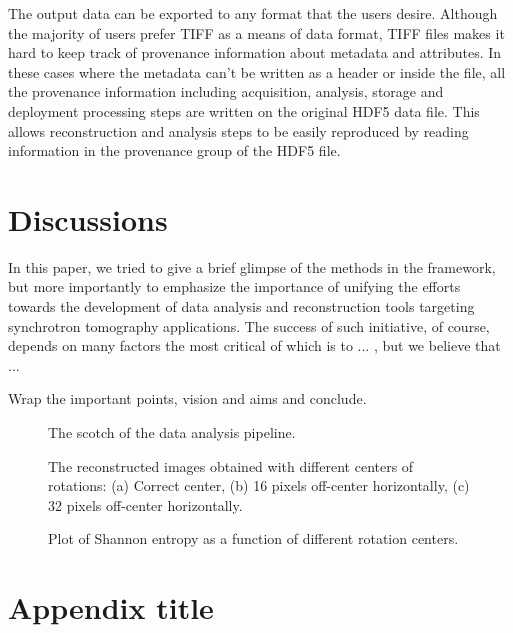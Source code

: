 \documentclass[pdf]{iucr}              %
\begin{document}
The output data can be exported to any format that the users desire. Although the majority of users prefer TIFF as a means of data format, TIFF files makes it hard to keep track of provenance information about metadata and attributes. In these cases where the metadata can't be written as a header or inside the file, all the provenance information including acquisition, analysis, storage and deployment processing steps are written on the original HDF5 data file. This allows reconstruction and analysis steps to be easily reproduced by reading information in the provenance group of the HDF5 file. 

\section{Discussions}

In this paper, we tried to give a brief glimpse of the methods in the framework, but more importantly to emphasize the importance of unifying the efforts towards the development of data analysis and reconstruction tools targeting synchrotron tomography applications. The success of such initiative, of course, depends on many factors the most critical of which is to ... , but we believe that ...

Wrap the important points, vision and aims and conclude.


\onecolumn
\begin{figure}
\centering
\caption{The scotch of the data analysis pipeline.}
\label{fig:ProcessSegmentation}
\end{figure}
\twocolumn


\begin{figure}
\centering
\caption{The reconstructed images obtained with different centers of rotations: (a) Correct center, (b) 16 pixels  off-center horizontally, (c) 32 pixels off-center horizontally.}
\label{fig:OptimizeCenter1}
\end{figure}

\begin{figure}
\centering
\caption{Plot of Shannon entropy as a function of different rotation centers.}
\label{fig:OptimizeCenter2}
\end{figure}


\appendix
\section{Appendix title}
\end{document}
